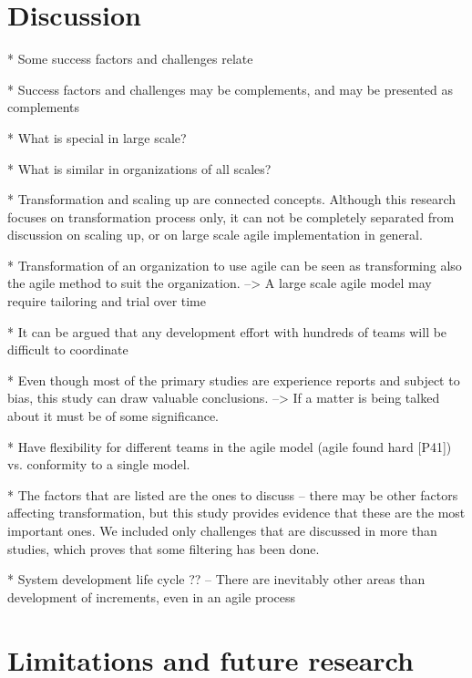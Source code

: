 \documentclass[preprint,authoryear,12pt]{elsarticle}
\begin{document}
\section{Discussion}
\label{sec:discussion}

* Some success factors and challenges relate

* Success factors and challenges may be complements, and may be presented as
  complements

* What is special in large scale?

* What is similar in organizations of all scales?

* Transformation and scaling up are connected concepts. Although this research
  focuses on transformation process only, it can not be completely separated
  from discussion on scaling up, or on large scale agile implementation in
  general.

* Transformation of an organization to use agile can be seen as transforming
  also the agile method to suit the organization.
  --> A large scale agile model may require tailoring and trial over time

* It can be argued that any development effort with hundreds of teams will be
  difficult to coordinate

* Even though most of the primary studies are experience reports and subject to
  bias, this study can draw valuable conclusions. --> If a matter is being
  talked about it must be of some significance.

* Have flexibility for different teams in the agile model (agile found
  hard [P41]) vs. conformity to a single model. 

* The factors that are listed are the ones to discuss -- there may be other
  factors affecting transformation, but this study provides evidence that these
  are the most important ones. We included only challenges that are discussed in
  more than studies, which proves that some filtering has been done.

* System development life cycle ?? -- There are inevitably other areas than
  development of increments, even in an agile process

\section{Limitations and future research}
\label{sec:conclusion}
\end{document}
